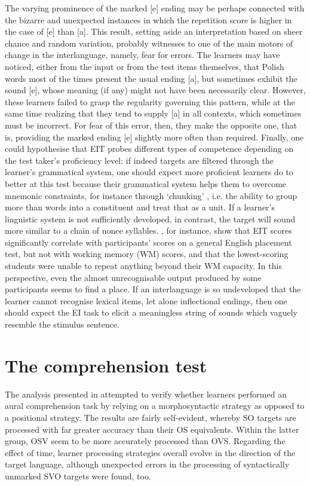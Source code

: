 The varying prominence of the marked [e] ending may be perhaps connected with the bizarre and unexpected instances in which the repetition score is higher in the case of [e] than [a]. This result, setting aside an interpretation based on sheer chance and random variation, probably witnesses to one of the main motors of change in the interlanguage, namely, fear for errors. The learners may have noticed, either from the input or from the test items themselves, that Polish words most of the times present the usual ending [a], but sometimes exhibit the sound [e], whose meaning (if any) might not have been necessarily clear. However, these learners failed to grasp the regularity governing this pattern, while at the same time realizing that they tend to supply [a] in all contexts, which sometimes must be incorrect. For fear of this error, then, they make the opposite one, that is, providing the marked ending [e] slightly more often than required. Finally, one could hypothesise that EIT probes different types of competence depending on the test taker's proficiency level: if indeed targets are filtered through the learner's grammatical system, one should expect more proficient learners do to better at this test because their grammatical system helps them to overcome mnemonic constraints, for instance through ‘chunking’ \citep{Miller1956}, i.e. the ability to group more than words into a constituent and treat that as a unit. If a learner's linguistic system is not sufficiently developed, in contrast, the target will sound more similar to a chain of nonce syllables. \citet{OkuraLonsdale2012}, for instance, show that EIT scores significantly correlate with participants' scores on a general English placement test, but not with working memory (WM) scores, and that the lowest-scoring students were unable to repeat anything beyond their WM capacity. In this perspective, even the almost unrecognisable output produced by some participants seems to find a place. If an interlanguage is so undeveloped that the learner cannot recognise lexical items, let alone inflectional endings, then one should expect the EI task to elicit a meaningless string of sounds which vaguely resemble the stimulus sentence. 

\section{The comprehension test}\label{sec:08:3}

The analysis presented in  attempted to verify whether learners performed an aural comprehension task by relying on a morphosyntactic strategy as opposed to a positional strategy. The results are fairly self-evident, whereby SO targets are processed with far greater accuracy than their OS equivalents. Within the latter group, OSV seem to be more accurately processed than OVS. Regarding the effect of time, learner processing strategies overall evolve in the direction of the target language, although unexpected errors in the processing of syntactically unmarked SVO targets were found, too.

